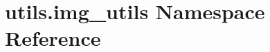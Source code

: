 \hypertarget{namespaceutils_1_1img__utils}{}\section{utils.\+img\+\_\+utils Namespace Reference}
\label{namespaceutils_1_1img__utils}
